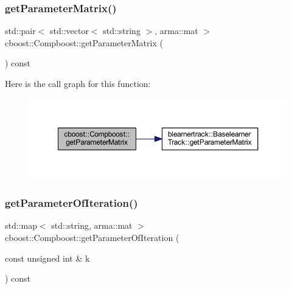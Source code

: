 \subsubsection{\texorpdfstring{get\+Parameter\+Matrix()}{getParameterMatrix()}}
{\footnotesize\ttfamily std\+::pair$<$ std\+::vector$<$ std\+::string $>$, arma\+::mat $>$ cboost\+::\+Compboost\+::get\+Parameter\+Matrix (\begin{DoxyParamCaption}{ }\end{DoxyParamCaption}) const}

Here is the call graph for this function\+:
\nopagebreak
\begin{figure}[H]
\begin{center}
\leavevmode
\includegraphics[width=350pt]{classcboost_1_1_compboost_a1652d7fa10039beaee1998e640f1b68a_cgraph}
\end{center}
\end{figure}
\mbox{\label{classcboost_1_1_compboost_a97b02aa81981e08658d896ff9798b5d0}} 
\subsubsection{\texorpdfstring{get\+Parameter\+Of\+Iteration()}{getParameterOfIteration()}}
{\footnotesize\ttfamily std\+::map$<$ std\+::string, arma\+::mat $>$ cboost\+::\+Compboost\+::get\+Parameter\+Of\+Iteration (\begin{DoxyParamCaption}\item[{const unsigned int \&}]{k }\end{DoxyParamCaption}) const}


